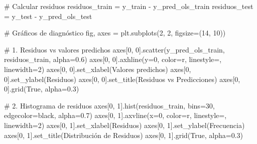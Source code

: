\documentclass[
  doc,
  floatsintext,
  longtable,
  a4paper,
  nolmodern,
  notxfonts,
  notimes,
  12pt,
  colorlinks=true,linkcolor=blue,citecolor=blue,urlcolor=blue]{apa7}
\newenvironment{Shaded}{\begin{snugshade}}{\end{snugshade}}
\newcommand{\CommentTok}[1]{\textcolor[rgb]{0.37,0.37,0.37}{#1}}
\newcommand{\DecValTok}[1]{\textcolor[rgb]{0.68,0.00,0.00}{#1}}
\newcommand{\FloatTok}[1]{\textcolor[rgb]{0.68,0.00,0.00}{#1}}
\newcommand{\NormalTok}[1]{\textcolor[rgb]{0.00,0.23,0.31}{#1}}
\newcommand{\OperatorTok}[1]{\textcolor[rgb]{0.37,0.37,0.37}{#1}}
\newcommand{\StringTok}[1]{\textcolor[rgb]{0.13,0.47,0.30}{#1}}
\newcommand{\VariableTok}[1]{\textcolor[rgb]{0.07,0.07,0.07}{#1}}
\begin{document}
\begin{Shaded}
\begin{Highlighting}[]
\CommentTok{\# Calcular residuos}
\NormalTok{residuos\_train }\OperatorTok{=}\NormalTok{ y\_train }\OperatorTok{{-}}\NormalTok{ y\_pred\_ols\_train}
\NormalTok{residuos\_test }\OperatorTok{=}\NormalTok{ y\_test }\OperatorTok{{-}}\NormalTok{ y\_pred\_ols\_test}

\CommentTok{\# Gráficos de diagnóstico}
\NormalTok{fig, axes }\OperatorTok{=}\NormalTok{ plt.subplots(}\DecValTok{2}\NormalTok{, }\DecValTok{2}\NormalTok{, figsize}\OperatorTok{=}\NormalTok{(}\DecValTok{14}\NormalTok{, }\DecValTok{10}\NormalTok{))}

\CommentTok{\# 1. Residuos vs valores predichos}
\NormalTok{axes[}\DecValTok{0}\NormalTok{, }\DecValTok{0}\NormalTok{].scatter(y\_pred\_ols\_train, residuos\_train, alpha}\OperatorTok{=}\FloatTok{0.6}\NormalTok{)}
\NormalTok{axes[}\DecValTok{0}\NormalTok{, }\DecValTok{0}\NormalTok{].axhline(y}\OperatorTok{=}\DecValTok{0}\NormalTok{, color}\OperatorTok{=}\StringTok{\textquotesingle{}r\textquotesingle{}}\NormalTok{, linestyle}\OperatorTok{=}\StringTok{\textquotesingle{}{-}{-}\textquotesingle{}}\NormalTok{, linewidth}\OperatorTok{=}\DecValTok{2}\NormalTok{)}
\NormalTok{axes[}\DecValTok{0}\NormalTok{, }\DecValTok{0}\NormalTok{].set\_xlabel(}\StringTok{\textquotesingle{}Valores predichos\textquotesingle{}}\NormalTok{)}
\NormalTok{axes[}\DecValTok{0}\NormalTok{, }\DecValTok{0}\NormalTok{].set\_ylabel(}\StringTok{\textquotesingle{}Residuos\textquotesingle{}}\NormalTok{)}
\NormalTok{axes[}\DecValTok{0}\NormalTok{, }\DecValTok{0}\NormalTok{].set\_title(}\StringTok{\textquotesingle{}Residuos vs Predicciones\textquotesingle{}}\NormalTok{)}
\NormalTok{axes[}\DecValTok{0}\NormalTok{, }\DecValTok{0}\NormalTok{].grid(}\VariableTok{True}\NormalTok{, alpha}\OperatorTok{=}\FloatTok{0.3}\NormalTok{)}

\CommentTok{\# 2. Histograma de residuos}
\NormalTok{axes[}\DecValTok{0}\NormalTok{, }\DecValTok{1}\NormalTok{].hist(residuos\_train, bins}\OperatorTok{=}\DecValTok{30}\NormalTok{, edgecolor}\OperatorTok{=}\StringTok{\textquotesingle{}black\textquotesingle{}}\NormalTok{, alpha}\OperatorTok{=}\FloatTok{0.7}\NormalTok{)}
\NormalTok{axes[}\DecValTok{0}\NormalTok{, }\DecValTok{1}\NormalTok{].axvline(x}\OperatorTok{=}\DecValTok{0}\NormalTok{, color}\OperatorTok{=}\StringTok{\textquotesingle{}r\textquotesingle{}}\NormalTok{, linestyle}\OperatorTok{=}\StringTok{\textquotesingle{}{-}{-}\textquotesingle{}}\NormalTok{, linewidth}\OperatorTok{=}\DecValTok{2}\NormalTok{)}
\NormalTok{axes[}\DecValTok{0}\NormalTok{, }\DecValTok{1}\NormalTok{].set\_xlabel(}\StringTok{\textquotesingle{}Residuos\textquotesingle{}}\NormalTok{)}
\NormalTok{axes[}\DecValTok{0}\NormalTok{, }\DecValTok{1}\NormalTok{].set\_ylabel(}\StringTok{\textquotesingle{}Frecuencia\textquotesingle{}}\NormalTok{)}
\NormalTok{axes[}\DecValTok{0}\NormalTok{, }\DecValTok{1}\NormalTok{].set\_title(}\StringTok{\textquotesingle{}Distribución de Residuos\textquotesingle{}}\NormalTok{)}
\NormalTok{axes[}\DecValTok{0}\NormalTok{, }\DecValTok{1}\NormalTok{].grid(}\VariableTok{True}\NormalTok{, alpha}\OperatorTok{=}\FloatTok{0.3}\NormalTok{)}


\end{Highlighting}
\end{Shaded}
\end{document}
